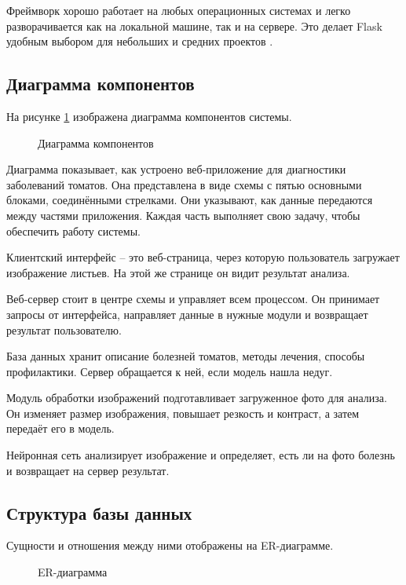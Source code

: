 Фреймворк хорошо работает на любых операционных системах и легко разворачивается как на локальной машине, так и на сервере. Это делает Flask удобным выбором для небольших и средних проектов \cite{flask5}.

\subsection{Диаграмма компонентов}

 На рисунке \ref{comp:image} изображена диаграмма компонентов системы.
 
 \begin{figure}[ht]
 	\caption{Диаграмма компонентов}
 	\label{comp:image}
 \end{figure}
 
 Диаграмма показывает, как устроено веб-приложение для диагностики заболеваний томатов. Она представлена в виде схемы с пятью основными блоками, соединёнными стрелками. Они указывают, как данные передаются между частями приложения. Каждая часть выполняет свою задачу, чтобы обеспечить работу системы.
 
 Клиентский интерфейс -- это веб-страница, через которую пользователь загружает изображение листьев. На этой же странице он видит результат анализа.%
 
 Веб-сервер стоит в центре схемы и управляет всем процессом. Он принимает запросы от интерфейса, направляет данные в нужные модули и возвращает результат пользователю. 
 
 База данных хранит описание болезней томатов, методы лечения, способы профилактики. Сервер обращается к ней, если модель нашла недуг.
 
 Модуль обработки изображений подготавливает загруженное фото для анализа. Он изменяет размер изображения, повышает резкость и контраст, а затем передаёт его в модель. 
 
 Нейронная сеть анализирует изображение и определяет, есть ли на фото болезнь и возвращает на сервер результат.

\subsection{Структура базы данных}

Сущности и отношения между ними отображены на ER-диаграмме.

 \begin{figure}[ht]
	\caption{ER-диаграмма}
	\label{er:image}
\end{figure}


